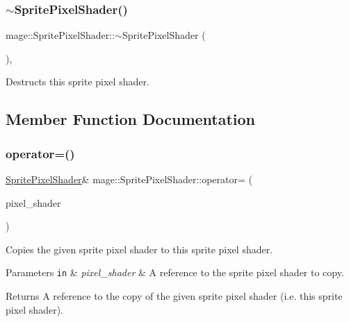 \subsubsection{\texorpdfstring{$\sim$\+Sprite\+Pixel\+Shader()}{~SpritePixelShader()}}
{\footnotesize\ttfamily mage\+::\+Sprite\+Pixel\+Shader\+::$\sim$\+Sprite\+Pixel\+Shader (\begin{DoxyParamCaption}{ }\end{DoxyParamCaption})\hspace{0.3cm}{\ttfamily [virtual]}, {\ttfamily [default]}}

Destructs this sprite pixel shader. 

\subsection{Member Function Documentation}
\hypertarget{classmage_1_1_sprite_pixel_shader_adf6e6f0872406b9df46cb87731ed1ae0}{}\label{classmage_1_1_sprite_pixel_shader_adf6e6f0872406b9df46cb87731ed1ae0} 
\subsubsection{\texorpdfstring{operator=()}{operator=()}\hspace{0.1cm}{\footnotesize\ttfamily [1/2]}}
{\footnotesize\ttfamily \hyperlink{classmage_1_1_sprite_pixel_shader}{Sprite\+Pixel\+Shader}\& mage\+::\+Sprite\+Pixel\+Shader\+::operator= (\begin{DoxyParamCaption}\item[{const \hyperlink{classmage_1_1_sprite_pixel_shader}{Sprite\+Pixel\+Shader} \&}]{pixel\+\_\+shader }\end{DoxyParamCaption})\hspace{0.3cm}{\ttfamily [delete]}}

Copies the given sprite pixel shader to this sprite pixel shader.


\begin{DoxyParams}[1]{Parameters}
\mbox{\tt in}  & {\em pixel\+\_\+shader} & A reference to the sprite pixel shader to copy. \\
\hline
\end{DoxyParams}
\begin{DoxyReturn}{Returns}
A reference to the copy of the given sprite pixel shader (i.\+e. this sprite pixel shader). 
\end{DoxyReturn}
\hypertarget{classmage_1_1_sprite_pixel_shader_ad982c266c5ba3510009a3f5e7519e284}{}\label{classmage_1_1_sprite_pixel_shader_ad982c266c5ba3510009a3f5e7519e284} 
